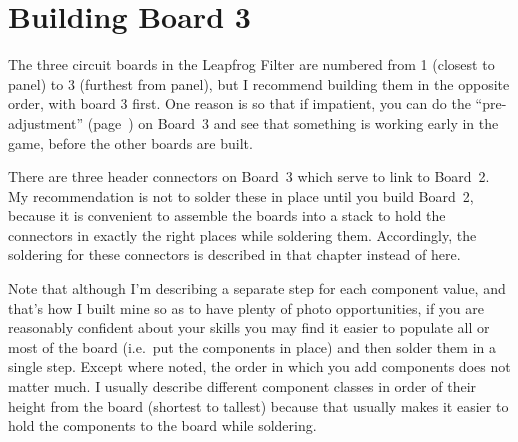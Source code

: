 
%
%
%
%
%
%

\chapter{Building Board 3}

The three circuit boards in the Leapfrog Filter are numbered from 1 (closest
to panel) to 3 (furthest from panel), but I recommend building them in the
opposite order, with board 3 first.  One reason is so that if impatient, you
can do the ``pre-adjustment'' (page~\pageref{ch:preadj}) on Board~3 and see
that something is working early in the game, before the other boards are
built.

There are three header connectors on Board~3 which serve to link to Board~2. 
My recommendation is not to solder these in place until you build Board~2,
because it is convenient to assemble the boards into a stack to hold the
connectors in exactly the right places while soldering them.  Accordingly,
the soldering for these connectors is described in that chapter instead of
here.

Note that although I'm describing a separate step for each component value,
and that's how I built mine so as to have plenty of photo opportunities, if
you are reasonably confident about your skills you may find it easier to
populate all or most of the board (i.e.\ put the components in place) and
then solder them in a single step.  Except where noted, the order in which
you add components does not matter much.  I usually describe different
component classes in order of their height from the board (shortest to
tallest) because that usually makes it easier to hold the components to the
board while soldering.

